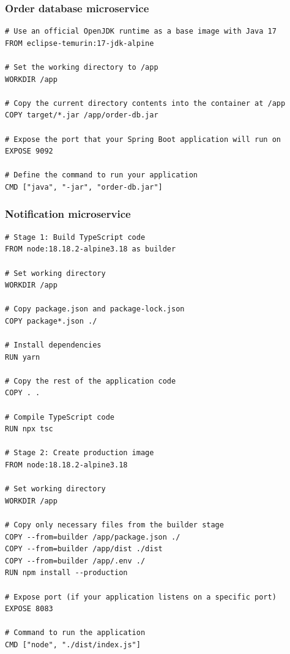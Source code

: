 \subsubsection*{Order database microservice}
\begin{lstlisting}[language=docker]
# Use an official OpenJDK runtime as a base image with Java 17
FROM eclipse-temurin:17-jdk-alpine

# Set the working directory to /app
WORKDIR /app

# Copy the current directory contents into the container at /app
COPY target/*.jar /app/order-db.jar

# Expose the port that your Spring Boot application will run on
EXPOSE 9092

# Define the command to run your application
CMD ["java", "-jar", "order-db.jar"]
\end{lstlisting}

\subsubsection*{Notification microservice}
\begin{lstlisting}[language=docker]
# Stage 1: Build TypeScript code
FROM node:18.18.2-alpine3.18 as builder

# Set working directory
WORKDIR /app

# Copy package.json and package-lock.json
COPY package*.json ./

# Install dependencies
RUN yarn

# Copy the rest of the application code
COPY . .

# Compile TypeScript code
RUN npx tsc

# Stage 2: Create production image
FROM node:18.18.2-alpine3.18

# Set working directory
WORKDIR /app

# Copy only necessary files from the builder stage
COPY --from=builder /app/package.json ./
COPY --from=builder /app/dist ./dist
COPY --from=builder /app/.env ./
RUN npm install --production

# Expose port (if your application listens on a specific port)
EXPOSE 8083

# Command to run the application
CMD ["node", "./dist/index.js"]
\end{lstlisting}

